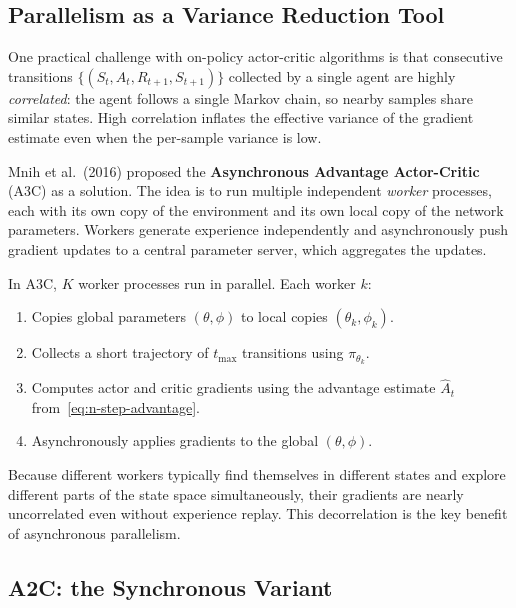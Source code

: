 \subsection{Parallelism as a Variance Reduction Tool}

One practical challenge with on-policy actor-critic algorithms is that
consecutive transitions $\{(S_t, A_t, R_{t+1}, S_{t+1})\}$ collected by a
single agent are highly \emph{correlated}: the agent follows a single
Markov chain, so nearby samples share similar states.  High correlation
inflates the effective variance of the gradient estimate even when the
per-sample variance is low.

Mnih et al.~(2016) proposed the \textbf{Asynchronous Advantage Actor-Critic}
(A3C) as a solution.  The idea is to run multiple independent
\emph{worker} processes, each with its own copy of the environment and its
own local copy of the network parameters.  Workers generate experience
independently and asynchronously push gradient updates to a central
parameter server, which aggregates the updates.

\begin{definition}[A3C architecture]
\label{def:a3c}
In A3C, $K$ worker processes run in parallel.  Each worker $k$:
\begin{enumerate}[label=\arabic*., leftmargin=*]
  \item Copies global parameters $(\theta, \phi)$ to local copies
    $(\theta_k, \phi_k)$.
  \item Collects a short trajectory of $t_\mathrm{max}$ transitions using
    $\pi_{\theta_k}$.
  \item Computes actor and critic gradients using the advantage estimate
    $\hat{A}_t$ from~\eqref{eq:n-step-advantage}.
  \item Asynchronously applies gradients to the global $(\theta, \phi)$.
\end{enumerate}
\end{definition}

Because different workers typically find themselves in different states and
explore different parts of the state space simultaneously, their gradients
are nearly uncorrelated even without experience replay.  This decorrelation
is the key benefit of asynchronous parallelism.

\subsection{A2C: the Synchronous Variant}


